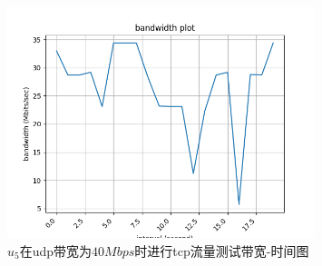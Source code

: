 \begin{figure}[h]
	\centering
	\includegraphics[width=0.8\textwidth]{image/u5-40.tcp.png}
	\caption{$u_5$在udp带宽为$40Mbps$时进行tcp流量测试带宽-时间图}
 	\label{fig:u540}
\end{figure}